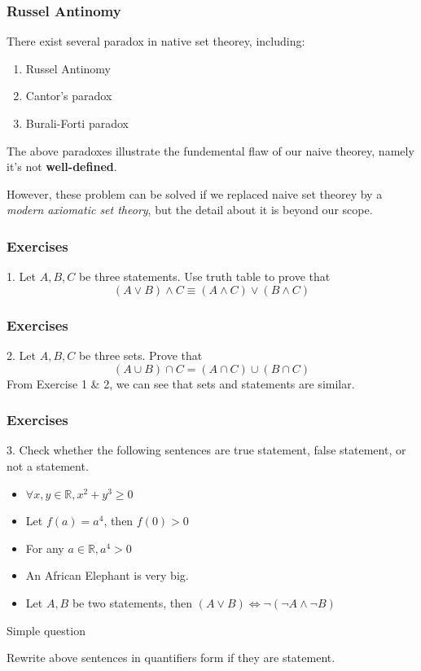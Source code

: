 \documentclass[12pt, t]{beamer}
\renewcommand{\emph}[1]{{\color{Turquoise3}\textsl{#1}}}
\begin{document}
\begin{frame}
    \frametitle{Russel Antinomy}
There exist several paradox in native set theorey, including:\\
\begin{enumerate}
    \item Russel Antinomy
    \item Cantor's paradox
    \item Burali-Forti paradox
\end{enumerate}
\par \hspace{1em} The above paradoxes illustrate the fundemental flaw of our naive theorey, namely
it's not \textbf{well-defined}.\\
\par \hspace{1em} However, these problem can be solved if we replaced naive set theorey by a 
\emph{modern axiomatic set theory}, but the detail about it is beyond our scope.\\
\end{frame}

\begin{frame}
    \frametitle{Exercises}
1. Let $A, B, C$ be three statements. Use truth table to prove that 
\begin{equation*}
    (A\vee B)\wedge C \equiv (A\wedge C)\vee (B\wedge C)
\end{equation*}
\end{frame}

\begin{frame}
    \frametitle{Exercises}
2. Let $A, B, C$ be three sets. Prove that
\begin{equation*}
    (A\cup B)\cap C =(A\cap C)\cup (B\cap C)
\end{equation*}
From Exercise 1 \& 2, we can see that sets and statements are similar.
\end{frame}

\begin{frame}
    \frametitle{Exercises}
3. Check whether the following sentences are true statement, false statement, or not a statement.
\begin{itemize}
    \item $\forall x, y\in \mathbb{R}, x^2+y^3\geq 0$
    \item Let  $f(a)=a^4$, then $f(0)>0$
    \item For any $a\in \mathbb{R}, a^4>0$
    \item An African Elephant is very big.
    \item Let $A, B$ be two statements, then $(A\vee B)\Leftrightarrow\neg(\neg A\wedge\neg B)$
\end{itemize}
Simple question
\begin{center}
    Rewrite above sentences in quantifiers form if they are statement.
\end{center}

\end{frame}
\end{document}
